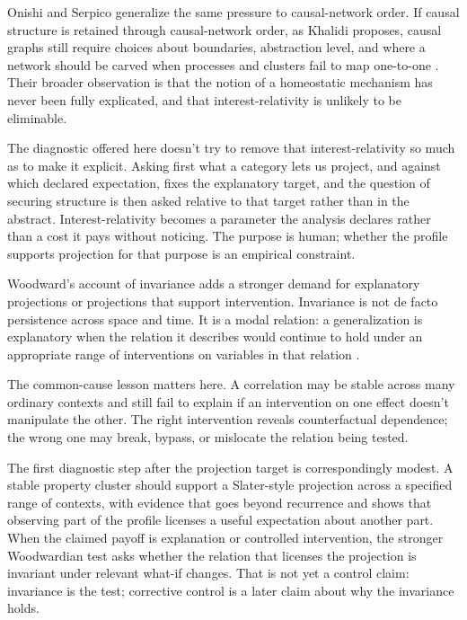 \documentclass[12pt]{article}
\begin{document}
Onishi and Serpico generalize the same pressure to causal-network order. If
causal structure is retained through causal-network order, as Khalidi proposes,
causal graphs still require choices about boundaries, abstraction level, and where
a network should be carved when processes and clusters fail to map one-to-one
\citep{onishi2022}. Their broader observation is that the notion of a homeostatic
mechanism has never been fully explicated, and that interest-relativity is
unlikely to be eliminable.

The diagnostic offered here doesn't try to remove that interest-relativity so
much as to make it explicit. Asking first what a category lets us project, and
against which declared expectation, fixes the explanatory target, and the question
of securing structure is then asked relative to that target rather than in the
abstract. Interest-relativity becomes a parameter the analysis declares rather than
a cost it pays without noticing. The purpose is human; whether the profile
supports projection for that purpose is an empirical constraint.

Woodward's account of invariance adds a stronger demand for explanatory
projections or projections that support intervention. Invariance is not de facto
persistence across space and time. It is a modal relation: a generalization is explanatory
when the relation it describes would continue to hold under an appropriate range
of interventions on variables in that relation \citep{woodward2001}.

The common-cause lesson matters here. A correlation may be stable across many
ordinary contexts and still fail to explain if an intervention on one effect
doesn't manipulate the other. The right intervention reveals counterfactual
dependence; the wrong one may break, bypass, or mislocate the relation being
tested.

The first diagnostic step after the projection target is correspondingly modest.
A stable property cluster should support a Slater-style projection across a
specified range of contexts, with evidence that goes beyond recurrence and shows
that observing part of the profile licenses a useful expectation about another
part. When the claimed payoff is explanation or controlled intervention, the
stronger Woodwardian test asks whether the relation that licenses the projection
is invariant under relevant what-if changes. That is not yet a control claim:
invariance is the test; corrective control is a later claim about why the
invariance holds.
\end{document}

